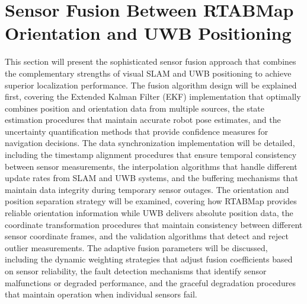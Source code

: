 \section{Sensor Fusion Between RTABMap Orientation and UWB Positioning}
This section will present the sophisticated sensor fusion approach that combines the complementary strengths of visual SLAM and UWB positioning to achieve superior localization performance. The fusion algorithm design will be explained first, covering the Extended Kalman Filter (EKF) implementation that optimally combines position and orientation data from multiple sources, the state estimation procedures that maintain accurate robot pose estimates, and the uncertainty quantification methods that provide confidence measures for navigation decisions. The data synchronization implementation will be detailed, including the timestamp alignment procedures that ensure temporal consistency between sensor measurements, the interpolation algorithms that handle different update rates from SLAM and UWB systems, and the buffering mechanisms that maintain data integrity during temporary sensor outages. The orientation and position separation strategy will be examined, covering how RTABMap provides reliable orientation information while UWB delivers absolute position data, the coordinate transformation procedures that maintain consistency between different sensor coordinate frames, and the validation algorithms that detect and reject outlier measurements. The adaptive fusion parameters will be discussed, including the dynamic weighting strategies that adjust fusion coefficients based on sensor reliability, the fault detection mechanisms that identify sensor malfunctions or degraded performance, and the graceful degradation procedures that maintain operation when individual sensors fail.


